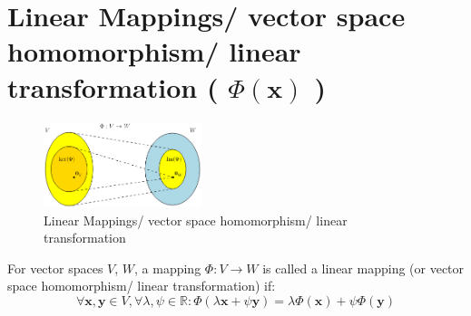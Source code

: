 \section{Linear Mappings/ vector space homomorphism/ linear transformation ( $\Phi(\mathbf{x})$ ) \cite{mfml-1}}\label{Linear Mappings/ vector space homomorphism/ linear transformation}

\begin{figure}[h]
    \centering
    \includegraphics[width=\linewidth, height=2.5cm, keepaspectratio]{Pictures/maths/linear-mapping.png}
    \caption{Linear Mappings/ vector space homomorphism/ linear transformation}
\end{figure}

For vector spaces $V$, $W$, a mapping $\Phi : V \to W$ is called a linear mapping (or vector space homomorphism/ linear transformation) if:
\[
    \forall \mathbf{x, y} \in V, \forall\lambda, \psi \in \mathbb{R} : \Phi(\lambda\mathbf{x} + \psi\mathbf{y}) = \lambda\Phi(\mathbf{x}) + \psi\Phi(\mathbf{y})
\]

